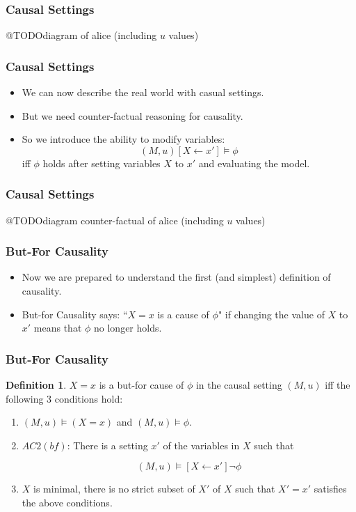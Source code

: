 \documentclass{beamer}
\theoremstyle{plain}
\theoremstyle{definition}
\newtheorem{defn}[thm]{Definition} %
\begin{document}
\begin{frame}
\frametitle{Causal Settings}

@TODOdiagram of alice (including $u$ values)

\end{frame}


\begin{frame}
\frametitle{Causal Settings}

\begin{itemize}
\item We can now describe the real world with casual settings.
\item But we need counter-factual reasoning for causality.
\item So we introduce the ability to modify variables:
\[
(M,u) [X \leftarrow x'] \models \phi
\] iff $\phi$ holds after setting variables $X$ to $x'$ and evaluating the model.
\end{itemize}

\end{frame}


\begin{frame}
\frametitle{Causal Settings}

@TODOdiagram counter-factual of alice (including $u$ values)

\end{frame}


\begin{frame}
\frametitle{But-For Causality}
\begin{itemize}
\item Now we are prepared to understand the first (and simplest) definition of causality.
\item But-for Causality says: ``$X=x$ is a cause of $\phi$" if changing the value of $X$ to $x'$ means that $\phi$ no longer holds.
\end{itemize}


\end{frame}

\begin{frame}
\frametitle{But-For Causality}

\begin{defn}$X=x$ is a but-for cause of $\phi$ in the causal setting $(M,u)$ iff the following 3 conditions hold:
\begin{enumerate}
\item $(M,u) \models (X=x)$ and $(M,u) \models \phi$.
\item $AC2(bf)$: There is a setting $x'$ of the variables in $X$ such that

\[
(M,u) \models [X\leftarrow x']\lnot \phi
\] 

\item $X$ is minimal, there is no strict subset of $X'$ of $X$ such that $X' = x'$ satisfies the above conditions.
\end{enumerate}

\end{defn}

\end{frame}
\end{document}
